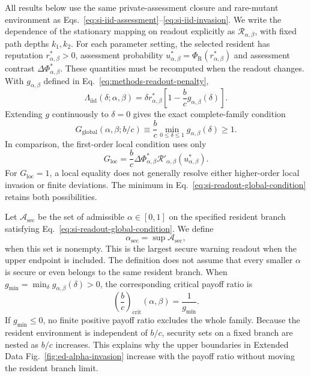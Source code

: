 \documentclass[fleqn,10pt]{wlscirep}
\begin{document}
All results below use the same private-assessment closure and rare-mutant environment as Eqs.~\eqref{eq:si-iid-assessment}--\eqref{eq:si-iid-invasion}. We write the dependence of the stationary mapping on readout explicitly as $\mathcal R_{\alpha,\beta}$, with fixed path depths $k_1,k_2$. For each parameter setting, the selected resident has reputation $r^*_{\alpha,\beta}>0$, assessment probability $u^*_{\alpha,\beta}=\Phi_{\mathrm R}(r^*_{\alpha,\beta})$ and assessment contrast $\Delta\Phi^*_{\alpha,\beta}$. These quantities must be recomputed when the readout changes. With $g_{\alpha,\beta}$ defined in Eq.~\eqref{eq:methods-readout-penalty},
\begin{equation}
\Lambda_{\mathrm{iid}}(\delta;\alpha,\beta)
=\delta r^*_{\alpha,\beta}
\left[1-\frac bc g_{\alpha,\beta}(\delta)\right].
\label{eq:si-readout-gain-identity}
\end{equation}
Extending $g$ continuously to $\delta=0$ gives the exact complete-family condition
\begin{equation}
G_{\mathrm{global}}(\alpha,\beta;b/c)
\equiv\frac bc\min_{0\leq\delta\leq1}g_{\alpha,\beta}(\delta)\geq1.
\label{eq:si-readout-global-condition}
\end{equation}
In comparison, the first-order local condition uses only
\begin{equation}
G_{\mathrm{loc}}
=\frac bc\Delta\Phi^*_{\alpha,\beta}
\mathcal R'_{\alpha,\beta}(u^*_{\alpha,\beta}).
\label{eq:si-readout-local-condition}
\end{equation}
For $G_{\mathrm{loc}}=1$, a local equality does not generally resolve either higher-order local invasion or finite deviations. The minimum in Eq.~\eqref{eq:si-readout-global-condition} retains both possibilities.

Let $\mathcal A_{\mathrm{sec}}$ be the set of admissible $\alpha\in[0,1]$ on the specified resident branch satisfying Eq.~\eqref{eq:si-readout-global-condition}. We define
\begin{equation}
\alpha_{\mathrm{sec}}=\sup\mathcal A_{\mathrm{sec}},
\label{eq:si-alpha-sec-definition}
\end{equation}
when this set is nonempty. This is the largest secure warning readout when the upper endpoint is included. The definition does not assume that every smaller $\alpha$ is secure or even belongs to the same resident branch. When $g_{\min}=\min_\delta g_{\alpha,\beta}(\delta)>0$, the corresponding critical payoff ratio is
\begin{equation}
\left(\frac bc\right)_{\mathrm{crit}}(\alpha,\beta)=\frac{1}{g_{\min}}.
\label{eq:si-readout-critical-bc}
\end{equation}
If $g_{\min}\leq0$, no finite positive payoff ratio excludes the whole family. Because the resident environment is independent of $b/c$, security sets on a fixed branch are nested as $b/c$ increases. This explains why the upper boundaries in Extended Data Fig.~\ref{fig:ed-alpha-invasion} increase with the payoff ratio without moving the resident branch limit.
\end{document}
